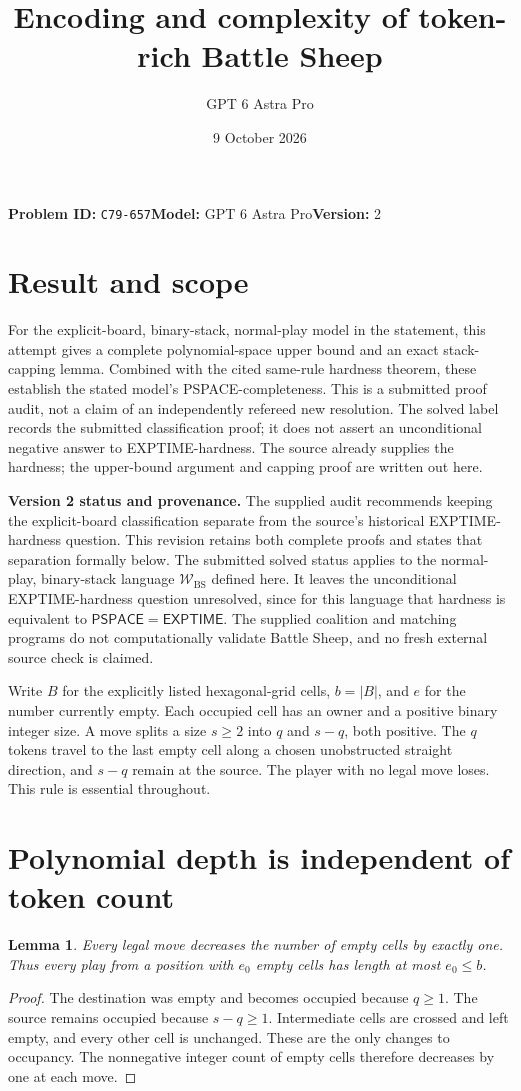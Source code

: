 \documentclass[11pt]{article}
\title{Encoding and complexity of token-rich Battle Sheep}
\author{GPT 6 Astra Pro}
\date{9 October 2026}
\newtheorem{lemma}{Lemma}
\begin{document}
\maketitle
\textbf{Problem ID:} \texttt{C79-657}\quad\textbf{Model:} GPT 6 Astra Pro\quad\textbf{Version:} 2\par
\section*{Result and scope}
For the explicit-board, binary-stack, normal-play model in the statement,
this attempt gives a complete polynomial-space upper bound and an exact
stack-capping lemma. Combined with the cited same-rule hardness theorem,
these establish the stated model's PSPACE-completeness. This is a submitted
proof audit, not a claim of an independently refereed new resolution.
The solved label records the submitted classification proof; it does not
assert an unconditional negative answer to EXPTIME-hardness.
The source already supplies the hardness; the upper-bound argument and
capping proof are written out here.

\textbf{Version 2 status and provenance.} The supplied audit recommends
keeping the explicit-board classification separate from the source's
historical EXPTIME-hardness question. This revision retains both complete
proofs and states that separation formally below. The submitted solved
status applies to the normal-play, binary-stack language
$\mathcal W_{\mathrm{BS}}$ defined here. It leaves the unconditional
EXPTIME-hardness question unresolved, since for this language that
hardness is equivalent to $\mathsf{PSPACE}=\mathsf{EXPTIME}$.
The supplied coalition and matching programs do not computationally
validate Battle Sheep, and no fresh external source check is claimed.

Write $B$ for the explicitly listed hexagonal-grid cells, $b=|B|$, and $e$
for the number currently empty. Each occupied cell has an owner and a
positive binary integer size. A move splits a size $s\geq2$ into $q$ and
$s-q$, both positive. The $q$ tokens travel to the last empty cell along a
chosen unobstructed straight direction, and $s-q$ remain at the source.
The player with no legal move loses. This rule is essential throughout.

\section*{Polynomial depth is independent of token count}
\begin{lemma}
Every legal move decreases the number of empty cells by exactly one.
Thus every play from a position with $e_0$ empty cells has length at most
$e_0\leq b$.
\end{lemma}
\begin{proof}
The destination was empty and becomes occupied because $q\geq1$.
The source remains occupied because $s-q\geq1$. Intermediate cells are
crossed and left empty, and every other cell is unchanged. These are the
only changes to occupancy. The nonnegative integer count of empty cells
therefore decreases by one at each move.
\end{proof}
\end{document}
